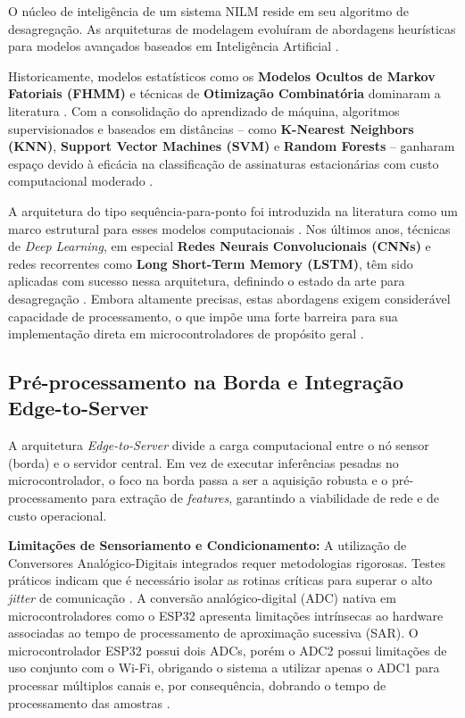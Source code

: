\documentclass[12pt]{article}
\begin{document}
O n\'ucleo de intelig\^encia de um sistema NILM reside em seu algoritmo de
desagrega\c{c}\~ao. As arquiteturas de modelagem evolu\'iram de abordagens
heur\'isticas para modelos avan\c{c}ados baseados em Intelig\^encia Artificial
\citep{ref4}.

Historicamente, modelos estat\'isticos como os \textbf{Modelos Ocultos de Markov
Fatoriais (FHMM)} e t\'ecnicas de \textbf{Otimiza\c{c}\~ao Combinat\'oria}
dominaram a literatura \citep{ref2,ref3,ref4}. Com a consolida\c{c}\~ao do aprendizado de
m\'aquina, algoritmos supervisionados e baseados em dist\^ancias -- como
\textbf{K-Nearest Neighbors (KNN)}, \textbf{Support Vector Machines (SVM)} e
\textbf{Random Forests} -- ganharam espa\c{c}o devido \`a efic\'acia na
classifica\c{c}\~ao de assinaturas estacion\'arias com custo computacional moderado
\citep{ref6}.

A arquitetura do tipo sequ\^encia-para-ponto foi introduzida na literatura como um
marco estrutural para esses modelos computacionais \citep{ref5}. Nos \'ultimos anos,
t\'ecnicas de \textit{Deep Learning}, em especial \textbf{Redes Neurais
Convolucionais (CNNs)} e redes recorrentes como \textbf{Long Short-Term Memory
(LSTM)}, t\^em sido aplicadas com sucesso nessa arquitetura, definindo o estado da
arte para desagrega\c{c}\~ao \citep{ref7}. Embora altamente precisas, estas
abordagens exigem consider\'avel capacidade de processamento, o que imp\~oe uma
forte barreira para sua implementa\c{c}\~ao direta em microcontroladores de
prop\'osito geral \citep{ref7}.

\subsection{Pr\'e-processamento na Borda e Integra\c{c}\~ao Edge-to-Server}

A arquitetura \textit{Edge-to-Server} divide a carga computacional entre o n\'o
sensor (borda) e o servidor central. Em vez de executar infer\^encias pesadas no
microcontrolador, o foco na borda passa a ser a aquisi\c{c}\~ao robusta e o
pr\'e-processamento para extra\c{c}\~ao de \textit{features}, garantindo a
viabilidade de rede e de custo operacional.

\textbf{Limita\c{c}\~oes de Sensoriamento e Condicionamento:} A utiliza\c{c}\~ao
de Conversores Anal\'ogico-Digitais integrados requer metodologias rigorosas.
Testes pr\'aticos indicam que \'e necess\'ario isolar as rotinas cr\'iticas para
superar o alto \textit{jitter} de comunica\c{c}\~ao \citep{ref8}. A convers\~ao
anal\'ogico-digital (ADC) nativa em microcontroladores como o ESP32 apresenta
limita\c{c}\~oes intr\'insecas ao hardware associadas ao tempo de processamento de
aproxima\c{c}\~ao sucessiva (SAR). O microcontrolador ESP32 possui dois ADCs, por\'em
o ADC2 possui limita\c{c}\~oes de uso conjunto com o Wi-Fi, obrigando o sistema a
utilizar apenas o ADC1 para processar m\'ultiplos canais e, por consequ\^encia,
dobrando o tempo de processamento das amostras \citep{ref8}.
\end{document}
